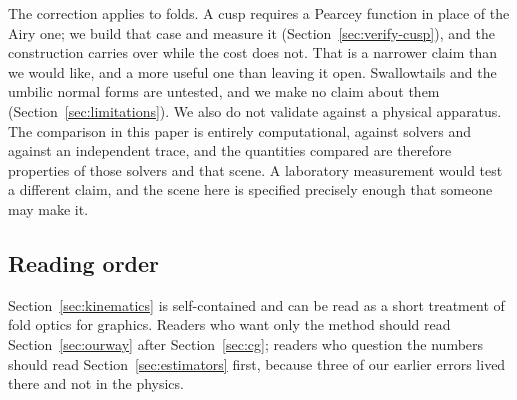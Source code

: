 The correction applies to folds. A cusp requires a Pearcey function in place of
the Airy one; we build that case and measure it
(Section~\ref{sec:verify-cusp}), and the construction carries over while the cost
does not. That is a narrower claim than we would like, and a more useful one
than leaving it open. Swallowtails and the umbilic normal forms are untested, and
we make no claim about them (Section~\ref{sec:limitations}). We also do not
validate against a physical
apparatus. The comparison in this paper is entirely computational, against
solvers and against an independent trace, and the quantities compared are
therefore properties of those solvers and that scene. A laboratory measurement
would test a different claim, and the scene here is specified precisely enough
that someone may make it.

\subsection{Reading order}
\label{sec:reading}

Section~\ref{sec:kinematics} is self-contained and can be read as a short
treatment of fold optics for graphics. Readers who want only the method should
read Section~\ref{sec:ourway} after Section~\ref{sec:cg}; readers who question
the numbers should read Section~\ref{sec:estimators} first, because three of our
earlier errors lived there and not in the physics.
